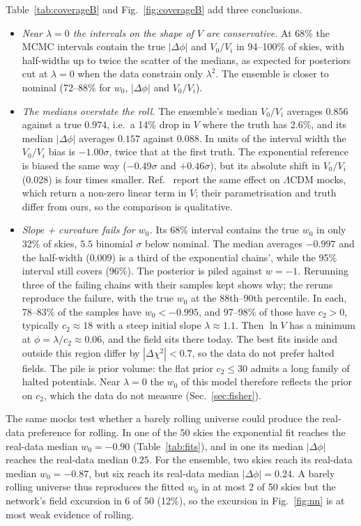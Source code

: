 \documentclass[11pt,a4paper]{article}
\begin{document}
Table~\ref{tab:coverageB} and Fig.~\ref{fig:coverageB} add three conclusions.
\begin{itemize}
\item \emph{Near $\lambda=0$ the intervals on the shape of $V$ are conservative.} At 68\% the MCMC intervals contain the true $|\Delta\phi|$ and $V_0/V_i$ in 94--100\% of skies, with half-widths up to twice the scatter of the medians, as expected for posteriors cut at $\lambda=0$ when the data constrain only $\lambda^2$. The ensemble is closer to nominal (72--88\% for $w_0$, $|\Delta\phi|$ and $V_0/V_i$).
\item \emph{The medians overstate the roll.} The ensemble's median $V_0/V_i$ averages $0.856$ against a true $0.974$, i.e.\ a 14\% drop in $V$ where the truth has 2.6\%, and its median $|\Delta\phi|$ averages $0.157$ against $0.088$. In units of the interval width the $V_0/V_i$ bias is $-1.00\sigma$, twice that at the first truth. The exponential reference is biased the same way ($-0.49\sigma$ and $+0.46\sigma$), but its absolute shift in $V_0/V_i$ (0.028) is four times smaller. Ref.~\cite{2505.10662} report the same effect on $\Lambda$CDM mocks, which return a non-zero linear term in $V$; their parametrisation and truth differ from ours, so the comparison is qualitative.
\item \emph{Slope + curvature fails for $w_0$.} Its 68\% interval contains the true $w_0$ in only 32\% of skies, $5.5$ binomial $\sigma$ below nominal. The median averages $-0.997$ and the half-width ($0.009$) is a third of the exponential chains', while the 95\% interval still covers (96\%). The posterior is piled against $w=-1$. Rerunning three of the failing chains with their samples kept shows why; the reruns reproduce the failure, with the true $w_0$ at the 88th--90th percentile. In each, 78--83\% of the samples have $w_0<-0.995$, and 97--98\% of those have $c_2>0$, typically $c_2\approx18$ with a steep initial slope $\lambda\approx1.1$. Then $\ln V$ has a minimum at $\phi=\lambda/c_2\approx0.06$, and the field sits there today. The best fits inside and outside this region differ by $|\Delta\chi^2|<0.7$, so the data do not prefer halted fields. The pile is prior volume: the flat prior $c_2\le30$ admits a long family of halted potentials. Near $\lambda=0$ the $w_0$ of this model therefore reflects the prior on $c_2$, which the data do not measure (Sec.~\ref{sec:fisher}).
\end{itemize}

The same mocks test whether a barely rolling universe could produce the real-data preference for rolling. In one of the 50 skies the exponential fit reaches the real-data median $w_0=-0.90$ (Table~\ref{tab:fits}), and in one its median $|\Delta\phi|$ reaches the real-data median $0.25$. For the ensemble, two skies reach its real-data median $w_0=-0.87$, but six reach its real-data median $|\Delta\phi|=0.24$. A barely rolling universe thus reproduces the fitted $w_0$ in at most 2 of 50 skies but the network's field excursion in 6 of 50 (12\%), so the excursion in Fig.~\ref{fig:nn} is at most weak evidence of rolling.
\end{document}
